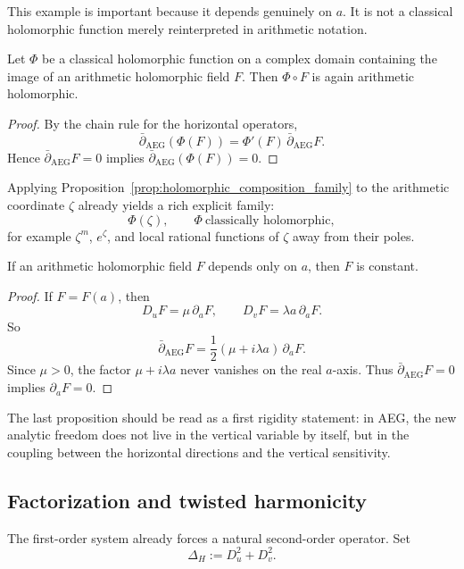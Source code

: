 This example is important because it depends genuinely on $a$. It is not a classical holomorphic function merely reinterpreted in arithmetic notation.

\begin{proposition}\label{prop:holomorphic_composition_family}
Let $\Phi$ be a classical holomorphic function on a complex domain containing the image of an arithmetic holomorphic field $F$. Then $\Phi\!\circ F$ is again arithmetic holomorphic.
\end{proposition}

\begin{proof}
By the chain rule for the horizontal operators,
\[
\bar\partial_{\mathrm{AEG}}(\Phi(F))
=
\Phi'(F)\,\bar\partial_{\mathrm{AEG}}F.
\]
Hence $\bar\partial_{\mathrm{AEG}}F=0$ implies $\bar\partial_{\mathrm{AEG}}(\Phi(F))=0$.
\end{proof}

Applying Proposition~\ref{prop:holomorphic_composition_family} to the arithmetic coordinate $\zeta$ already yields a rich explicit family:
\[
\Phi(\zeta),
\qquad
\Phi\ \text{classically holomorphic},
\]
for example $\zeta^m$, $e^\zeta$, and local rational functions of $\zeta$ away from their poles.

\begin{proposition}\label{prop:rigidity_a_only_holomorphic}
If an arithmetic holomorphic field $F$ depends only on $a$, then $F$ is constant.
\end{proposition}

\begin{proof}
If $F=F(a)$, then
\[
D_uF=\mu\,\partial_aF,
\qquad
D_vF=\lambda a\,\partial_aF.
\]
So
\[
\bar\partial_{\mathrm{AEG}}F
=
\frac12(\mu+i\lambda a)\,\partial_aF.
\]
Since $\mu>0$, the factor $\mu+i\lambda a$ never vanishes on the real $a$-axis. Thus $\bar\partial_{\mathrm{AEG}}F=0$ implies $\partial_aF=0$.
\end{proof}

The last proposition should be read as a first rigidity statement: in AEG, the new analytic freedom does not live in the vertical variable by itself, but in the coupling between the horizontal directions and the vertical sensitivity.

\subsection{Factorization and twisted harmonicity}

The first-order system already forces a natural second-order operator. Set
\[
\Delta_H:=D_u^2+D_v^2.
\]

